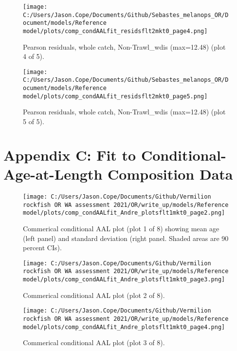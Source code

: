 \documentclass[11pt,
  english,
  letterpaper,
]{article}
\begin{document}
\begin{figure}
\centering
\texttt{[image: C:/Users/Jason.Cope/Documents/Github/Sebastes\_melanops\_OR/Document/models/Reference model/plots/comp\_condAALfit\_residsflt2mkt0\_page4.png]}
\caption{Pearson residuals, whole catch, Non-Trawl\_wdis (max=12.48) (plot 4 of 5).\label{fig:comp_condAALfit_residsflt2mkt0_page4}}
\end{figure}

\begin{figure}
\centering
\texttt{[image: C:/Users/Jason.Cope/Documents/Github/Sebastes\_melanops\_OR/Document/models/Reference model/plots/comp\_condAALfit\_residsflt2mkt0\_page5.png]}
\caption{Pearson residuals, whole catch, Non-Trawl\_wdis (max=12.48) (plot 5 of 5).\label{fig:comp_condAALfit_residsflt2mkt0_page5}}
\end{figure}

\clearpage

\hypertarget{app-c}{%
\section{Appendix C: Fit to Conditional-Age-at-Length Composition Data}\label{app-c}}

\begin{figure}
\centering
\texttt{[image: C:/Users/Jason.Cope/Documents/Github/Vermilion rockfish OR WA assessment 2021/OR/write\_up/models/Reference model/plots/comp\_condAALfit\_Andre\_plotsflt1mkt0\_page2.png]}
\caption{Commerical conditional AAL plot (plot 1 of 8) showing mean age (left panel) and standard deviation (right panel. Shaded areas are 90 percent CIs).\label{fig:comp_condAALfit_Andre_plotsflt1mkt0_page2}}
\end{figure}

\begin{figure}
\centering
\texttt{[image: C:/Users/Jason.Cope/Documents/Github/Vermilion rockfish OR WA assessment 2021/OR/write\_up/models/Reference model/plots/comp\_condAALfit\_Andre\_plotsflt1mkt0\_page3.png]}
\caption{Commerical conditional AAL plot (plot 2 of 8).\label{fig:comp_condAALfit_Andre_plotsflt1mkt0_page3}}
\end{figure}

\begin{figure}
\centering
\texttt{[image: C:/Users/Jason.Cope/Documents/Github/Vermilion rockfish OR WA assessment 2021/OR/write\_up/models/Reference model/plots/comp\_condAALfit\_Andre\_plotsflt1mkt0\_page4.png]}
\caption{Commerical conditional AAL plot (plot 3 of 8).\label{fig:comp_condAALfit_Andre_plotsflt1mkt0_page4}}
\end{figure}
\end{document}
